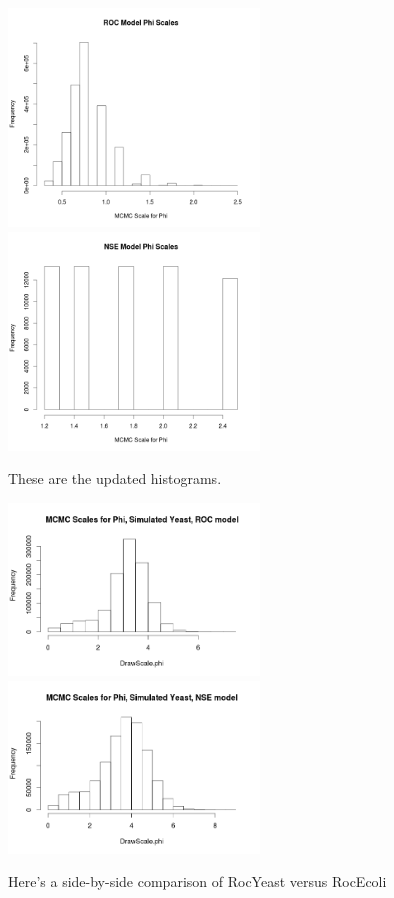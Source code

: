 \includegraphics[width=0.5\textwidth]{data/oct10-roc-scalehist.png}
\includegraphics[width=0.5\textwidth]{data/oct10-nse-scalehist.png}


These are the updated histograms.

\includegraphics[width=0.5\textwidth]{data/oct17-RocYeastScales.png}
\includegraphics[width=0.5\textwidth]{data/oct17-NseYeastScales.png}

Here's a side-by-side comparison of RocYeast versus RocEcoli


